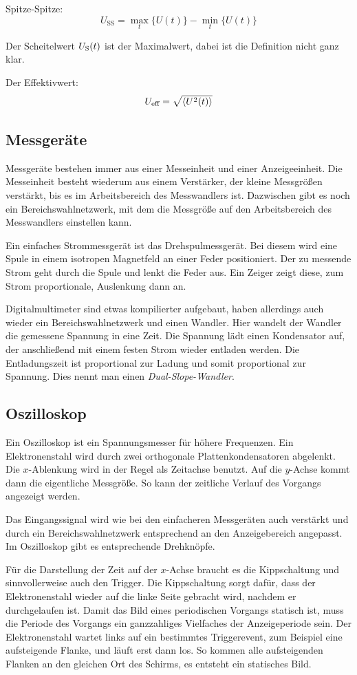 Spitze-Spitze:
\[
	U_\text{SS} = \max_t \{ U(t) \} - \min_t \{ U(t) \}
\]

Der Scheitelwert $U_\text S(t)$ ist der Maximalwert, dabei ist die Definition
nicht ganz klar.

Der Effektivwert:
\[
	U_\text{eff} = \sqrt{\braket{U^2(t)}}
\]

\subsection{Messgeräte}

Messgeräte bestehen immer aus einer Messeinheit und einer Anzeigeeinheit. Die
Messeinheit besteht wiederum aus einem Verstärker, der kleine Messgrößen
verstärkt, bis es im Arbeitsbereich des Messwandlers ist. Dazwischen gibt es
noch ein Bereichswahlnetzwerk, mit dem die Messgröße auf den Arbeitsbereich des
Messwandlers einstellen kann.

Ein einfaches Strommessgerät ist das Drehspulmessgerät. Bei diesem wird eine
Spule in einem isotropen Magnetfeld an einer Feder positioniert. Der zu
messende Strom geht durch die Spule und lenkt die Feder aus. Ein Zeiger zeigt
diese, zum Strom proportionale, Auslenkung dann an.

Digitalmultimeter sind etwas kompilierter aufgebaut, haben allerdings auch
wieder ein Bereichswahlnetzwerk und einen Wandler. Hier wandelt der Wandler die
gemessene Spannung in eine Zeit. Die Spannung lädt einen Kondensator auf, der
anschließend mit einem festen Strom wieder entladen werden. Die Entladungszeit
ist proportional zur Ladung und somit proportional zur Spannung. Dies nennt man
einen \emph{Dual-Slope-Wandler}.

\subsection{Oszilloskop}

Ein Oszilloskop ist ein Spannungsmesser für höhere Frequenzen. Ein
Elektronenstahl wird durch zwei orthogonale Plattenkondensatoren abgelenkt. Die
$x$-Ablenkung wird in der Regel als Zeitachse benutzt. Auf die $y$-Achse kommt
dann die eigentliche Messgröße. So kann der zeitliche Verlauf des Vorgangs
angezeigt werden.

Das Eingangssignal wird wie bei den einfacheren Messgeräten auch verstärkt und
durch ein Bereichswahlnetzwerk entsprechend an den Anzeigebereich angepasst. Im
Oszilloskop gibt es entsprechende Drehknöpfe.

Für die Darstellung der Zeit auf der $x$-Achse braucht es die Kippschaltung und
sinnvollerweise auch den Trigger. Die Kippschaltung sorgt dafür, dass der
Elektronenstahl wieder auf die linke Seite gebracht wird, nachdem er
durchgelaufen ist. Damit das Bild eines periodischen Vorgangs statisch ist,
muss die Periode des Vorgangs ein ganzzahliges Vielfaches der Anzeigeperiode
sein. Der Elektronenstahl wartet links auf ein bestimmtes Triggerevent, zum
Beispiel eine aufsteigende Flanke, und läuft erst dann los. So kommen alle
aufsteigenden Flanken an den gleichen Ort des Schirms, es entsteht ein
statisches Bild.

